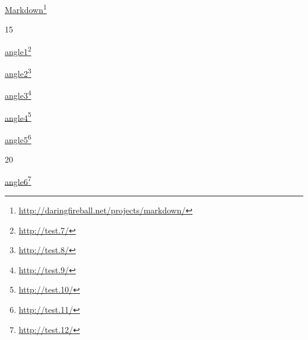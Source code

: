 \href{http://daringfireball.net/projects/markdown/}{Markdown}\footnote{\href{http://daringfireball.net/projects/markdown/}{http:\slash \slash daringfireball.net\slash projects\slash markdown\slash }}

15

\href{http://test.7/}{angle1}\footnote{\href{http://test.7/}{http:\slash \slash test.7\slash }}

\href{http://test.8/}{angle2}\footnote{\href{http://test.8/}{http:\slash \slash test.8\slash }}

\href{http://test.9/}{angle3}\footnote{\href{http://test.9/}{http:\slash \slash test.9\slash }}

\href{http://test.10/}{angle4}\footnote{\href{http://test.10/}{http:\slash \slash test.10\slash }}

\href{http://test.11/}{angle5}\footnote{\href{http://test.11/}{http:\slash \slash test.11\slash }}

20

\href{http://test.12/}{angle6}\footnote{\href{http://test.12/}{http:\slash \slash test.12\slash }}



